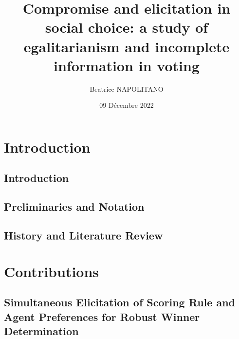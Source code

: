 \documentclass[a4paper, 11pt,oneside]{book}
\title{Compromise and elicitation in social choice: a study of egalitarianism and incomplete information in voting}
\author{Beatrice NAPOLITANO}
\institute{l'Université Paris-Dauphine}
\date{09 Décembre 2022}
\begin{document}
\hypersetup{pageanchor=false}
\begin{titlepage}
\maketitle{}
\end{titlepage}

\frontmatter

\begingroup
\hypersetup{hidelinks}

\tableofcontents

\listoffigures
{}

\listoftables
{}

\endgroup

\printglossary[toctitle=List of Abbreviations,title=List of Abbreviations,type=\acronymtype]

\mainmatter

\part{Introduction} 

	\chapter{Introduction}
		\label{ch:intro}
		
			
	\chapter{Preliminaries and Notation}
		\label{ch:preliminaries}
		
	
	\chapter{History and Literature Review}
		\label{ch:literature}
		
		
		
		
	
\part{Contributions}
	\label{part:contributions}

	\chapter[Simultaneous Elicitation of PSR and Agent Preferences]{Simultaneous Elicitation of Scoring Rule and Agent Preferences for Robust Winner Determination}
		\label{ch:minimax}
		
\end{document}
